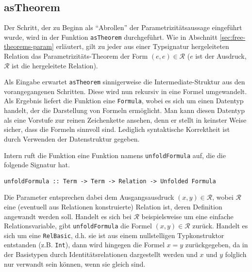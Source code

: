 \subsection{asTheorem}

Der Schritt, der zu Beginn als ``Abrollen'' der Parametrizitätsaussage eingeführt wurde, wird in der Funktion \texttt{asTheorem}
durchgeführt. Wie in Abschnitt \ref{sec:free-theorems-param} erläutert, gilt zu jeder aus einer Typsignatur hergeleiteten
Relation das Parametrizitäts-Theorem der Form $(e, e) \in \mathcal{R}$ ($e$ ist der Ausdruck, $\mathcal{R}$ ist die hergeleitete
Relation).

Als Eingabe erwartet \texttt{asTheorem} sinnigerweise die Intermediate-Struktur aus den vorangegangenen Schritten. Diese wird
nun rekursiv in eine Formel umgewandelt. Als Ergebnis liefert die Funktion eine \texttt{Formula}, wobei es sich um einen
Datentyp handelt, der die Darstellung von Formeln ermöglicht. Man kann diesen Datentyp als eine Vorstufe zur reinen
Zeichenkette ansehen, denn er stellt in keinster Weise sicher, dass die Formeln sinnvoll sind. Lediglich syntaktische Korrektheit
ist durch Verwenden der Datenstruktur gegeben.


Intern ruft die Funktion eine Funktion namens \texttt{unfoldFormula} auf, die die folgende Signatur hat.

\begin{verbatim}
unfoldFormula :: Term -> Term -> Relation -> Unfolded Formula
\end{verbatim}

Die Parameter entsprechen dabei dem Ausgangsausdruck $(x, y) \in \mathcal{R}$, wobei $\mathcal{R}$ eine (eventuell aus
Relationen konstruierte) Relation ist, deren Definition angewandt werden soll. Handelt es sich bei $\mathcal{R}$ beispielsweise
um eine einfache Relationsvariable, gibt \texttt{unfoldFormula} die Formel $(x, y) \in \mathcal{R}$ zurück. Handelt es sich
um eine \texttt{RelBasic}, d.h. sie ist aus einem nullstelligen Typkonstruktor entstanden (z.B. \texttt{Int}), dann wird hingegen
die Formel $x = y$ zurückgegeben, da in der Basistypen durch Identitätsrelationen dargestellt werden und $x$ und $y$ folglich
nur verwandt sein können, wenn sie gleich sind.

